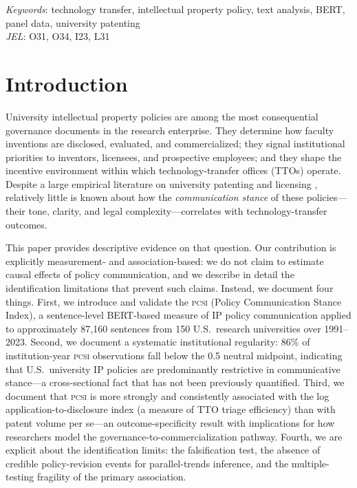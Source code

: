 \documentclass[12pt]{article}
\newcommand{\PCSI}{\textsc{pcsi}}
\begin{document}
\begin{titlepage}
\begin{center}
\vspace{0.8cm}
{\small \textit{Keywords}: technology transfer, intellectual property policy,
text analysis, BERT, panel data, university patenting}\\[0.3em]
{\small \textit{JEL}: O31, O34, I23, L31}

\end{center}
\end{titlepage}

\section{Introduction}
\label{sec:intro}

University intellectual property policies are among the most consequential governance
documents in the research enterprise. They determine how faculty inventions are disclosed,
evaluated, and commercialized; they signal institutional priorities to inventors, licensees,
and prospective employees; and they shape the incentive environment within which
technology-transfer offices (TTOs) operate. Despite a large empirical literature on
university patenting and licensing \citep{henderson1998, mowery2001, dechenaux2011},
relatively little is known about how the \emph{communication stance} of these
policies---their tone, clarity, and legal complexity---correlates with technology-transfer
outcomes.

This paper provides descriptive evidence on that question. Our contribution is explicitly
measurement- and association-based: we do not claim to estimate causal effects of policy
communication, and we describe in detail the identification limitations that prevent such
claims. Instead, we document four things. First, we introduce and validate the
\PCSI{} (Policy Communication Stance Index), a sentence-level BERT-based measure of
IP policy communication applied to approximately 87,160 sentences from 150 U.S.\ research
universities over 1991--2023. Second, we document a systematic institutional regularity:
86\% of institution-year \PCSI{} observations fall below the 0.5 neutral midpoint,
indicating that U.S.\ university IP policies are predominantly restrictive in
communicative stance---a cross-sectional fact that has not been previously quantified.
Third, we document that \PCSI{} is more strongly and consistently associated with the
log application-to-disclosure index (a measure of TTO triage efficiency) than with
patent volume per se---an outcome-specificity result with implications for how researchers
model the governance-to-commercialization pathway. Fourth, we are explicit about the
identification limits: the falsification test, the absence of credible policy-revision
events for parallel-trends inference, and the multiple-testing fragility of the primary
association.
\end{document}
